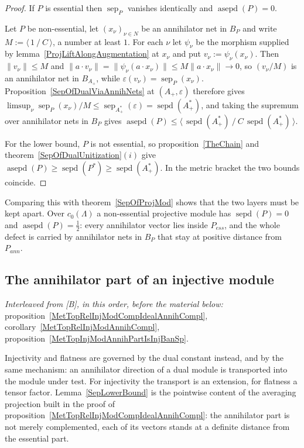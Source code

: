 \documentclass[11pt]{article}
\theoremstyle{plain}
\theoremstyle{definition}
\DeclareMathOperator{\sep}{sep}
\DeclareMathOperator{\sepd}{sepd}
\DeclareMathOperator{\asepd}{asepd}
\begin{document}
\begin{proof}
If $P$ is essential then $\sep_P$ vanishes identically and $\asepd(P)=0$.

Let $P$ be non-essential, let ${(x_\nu)}_{\nu\in N}$ be an annihilator net in
$B_P$ and write $M:=\langle\,1\ /\ C\,\rangle$, a number at least $1$. For each
$\nu$ let $\psi_\nu$ be the morphism supplied by
lemma~\ref{ProjLiftAlongAugmentation} at $x_\nu$ and put
$v_\nu:=\psi_\nu(x_\nu)$. Then $\lVert v_\nu\rVert\leq M$ and
$\lVert a\cdot v_\nu\rVert=\lVert\psi_\nu(a\cdot x_\nu)\rVert
\leq M\lVert a\cdot x_\nu\rVert\to 0$, so ${(v_\nu/M)}$ is an annihilator net in
$B_{A_+}$, while $\varepsilon(v_\nu)=\sep_P(x_\nu)$.
Proposition~\ref{SepOfDualViaAnnihNets} at $(A_+,\varepsilon)$ therefore gives
$\limsup_\nu\sep_P(x_\nu)/M\leq\sep_{A_+^*}(\varepsilon)=\sepd(A_+^*)$, and
taking the supremum over annihilator nets in $B_P$ gives
$\asepd(P)\leq\langle\,\sepd(A_+^*)\ /\ C\,\sepd(A_+^*)\,\rangle$.

For the lower bound, $P$ is not essential, so proposition~\ref{TheChain} and
theorem~\ref{SepOfDualUnitization}$(i)$ give
$\asepd(P)\geq\sepd(P^*)\geq\sepd(A_+^*)$. In the metric bracket the two bounds
coincide.
\end{proof}

Comparing this with theorem~\ref{SepOfProjMod} shows that the two layers must be
kept apart. Over $c_0(\Lambda)$ a non-essential projective module has
$\sepd(P)=0$ and $\asepd(P)=\tfrac{1}{2}$: every annihilator vector lies inside
$P_{ess}$, and the whole defect is carried by annihilator nets in $B_P$ that stay
at positive distance from $P_{ann}$.

\subsection{The annihilator part of an injective module}\label{SubSectionAnnihPartOfInjMod}

\emph{Interleaved from [B], in this order, before the material below:}
proposition~\ref{MetTopRelInjModCompIdealAnnihCompl},
corollary~\ref{MetTopRelInjModAnnihCompl},
proposition~\ref{MetTopInjModAnnihPartIsInjBanSp}.

Injectivity and flatness are governed by the dual constant instead, and by the
same mechanism: an annihilator direction of a dual module is transported into the
module under test. For injectivity the transport is an extension, for flatness a
tensor factor. Lemma~\ref{SepLowerBound} is the pointwise content of the
averaging projection built in the proof of
proposition~\ref{MetTopRelInjModCompIdealAnnihCompl}: the annihilator part is not
merely complemented, each of its vectors stands at a definite distance from the
essential part.
\end{document}
